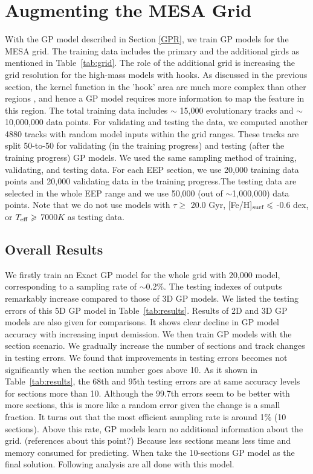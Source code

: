 \section{Augmenting the MESA Grid}\label{sec:augmentation}

With the GP model described in Section \ref{GPR},  we train GP models for the MESA grid. The training data includes the primary and the additional girds as mentioned in Table~\ref{tab:grid}. The role of the additional grid is increasing the grid resolution for the high-mass models with hooks. As discussed in the previous section, the kernel function in the 'hook' area are much more complex than other regions , and hence a GP model requires more information to map the feature in this region. The total training data includes $\sim$ 15,000 evolutionary tracks and $\sim$ 10,000,000 data points. For validating and testing the data, we computed another 4880 tracks with random model inputs within the grid ranges. These tracks are split 50-to-50 for validating (in the training progress) and testing (after the training progress) GP models. We used the same sampling method of training, validating, and testing data. For each EEP section, we use 20,000 training data points and 20,000 validating data in the training progress.The testing data are selected in the whole EEP range and we use 50,000 (out of $\sim$1,000,000) data points. Note that we do not use models with $\tau \geq$ 20.0 Gyr, [Fe/H]$_{\rm surf} \leq$ -0.6 dex, or $T_{\rm eff} \geq$ 7000$K$ as testing data.    

\subsection{Overall Results}

We firstly train an Exact GP model for the whole grid with 20,000 model, corresponding to a sampling rate of $\sim$0.2\%. The testing indexes of outputs remarkably increase compared to those of 3D GP models. We listed the testing errors of this 5D GP model in Table~\ref{tab:results}. Results of 2D and 3D GP models are also given for comparisons. It shows clear decline in GP model accuracy with increasing input demission. 
%
We then train GP models with the section scenario. We gradually increase the number of sections and track changes in testing errors. We found that improvements in testing errors becomes not significantly when the section number goes above 10. As it shown in Table~\ref{tab:results}, the 68th and 95th testing errors are at same accuracy levels for sections more than 10. Although the 99.7th errors seem to be better with more sections, this is more like a random error given the change is a small fraction. 
%
It turns out that the most efficient sampling rate is around 1\% (10 sections). Above this rate, GP models learn no additional information about the grid. (references about this point?) 
%
Because less sections means less time and memory consumed for predicting. When take the 10-sections GP model as the final solution. Following analysis are all done with this model.   


